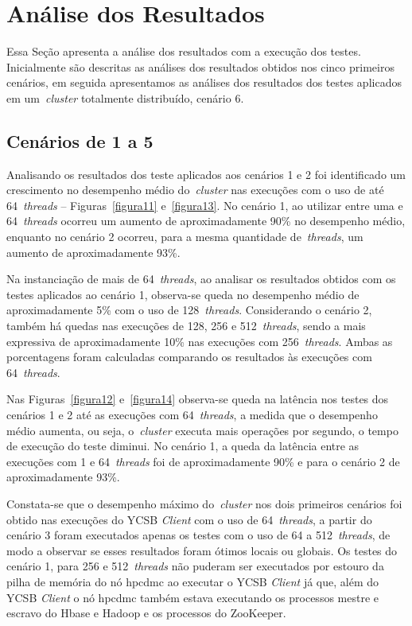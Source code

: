 \documentclass[12pt]{article}
\begin{document}
\section{Análise dos Resultados}
\label{sec:resultados}

Essa Seção apresenta a análise dos resultados com a execução dos testes. Inicialmente são descritas as análises dos resultados obtidos nos cinco primeiros cenários, em seguida apresentamos as análises dos resultados dos testes aplicados em um~\emph{cluster} totalmente distribuído, cenário 6.

\subsection{Cenários de 1 a 5}

Analisando os resultados dos teste aplicados aos cenários 1 e 2 foi identificado um crescimento no desempenho médio do~\emph{cluster} nas execuções com o uso de até 64~\emph{threads} -- Figuras~\ref{figura11} e~\ref{figura13}. 
No cenário 1, ao utilizar entre uma e 64~\emph{threads} ocorreu um aumento de aproximadamente 90\% no desempenho médio, enquanto no cenário 2 ocorreu, para a mesma quantidade de~\emph{threads}, um aumento de aproximadamente 93\%.

Na instanciação de mais de 64~\emph{threads}, ao analisar os resultados obtidos com os testes aplicados ao cenário 1, observa-se queda no desempenho médio de aproximadamente 5\% com o uso de 128~\emph{threads}. Considerando o cenário 2, também há quedas nas execuções de 128, 256 e 512~\emph{threads}, sendo a mais expressiva de aproximadamente 10\% nas execuções com 256~\emph{threads}. 
Ambas as porcentagens foram calculadas comparando os resultados às execuções com 64~\emph{threads}.

Nas Figuras~\ref{figura12} e~\ref{figura14} observa-se queda na latência nos testes dos cenários 1 e 2 até as execuções com 64~\emph{threads}, a medida que o desempenho médio aumenta, ou seja, o~\emph{cluster} executa mais operações por segundo, o tempo de execução do teste diminui. No cenário 1, a queda da latência entre as execuções com 1 e 64~\emph{threads} foi de aproximadamente 90\% e para o cenário 2 de aproximadamente 93\%.

Constata-se que o desempenho máximo do~\emph{cluster} nos dois primeiros cenários foi obtido nas execuções do YCSB \textit{Client} com o uso de 64~\emph{threads}, a partir do cenário 3 foram executados apenas os testes com o uso de 64 a 512~\emph{threads}, de modo a observar se esses resultados foram ótimos locais ou globais. Os testes do cenário 1, para 256 e 512~\emph{threads} não puderam ser executados por estouro da pilha de memória do nó hpcdmc ao executar o YCSB \textit{Client} já que, além do YCSB \textit{Client} o nó hpcdmc também estava executando os processos mestre e escravo do Hbase e Hadoop e os processos do ZooKeeper.
\end{document}
